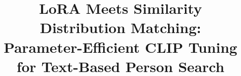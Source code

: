 \documentclass[conference,a4paper]{IEEEtran}
\begin{document}
\title{LoRA Meets Similarity Distribution Matching:\\
Parameter-Efficient CLIP Tuning for Text-Based Person Search}

\author{
}

\maketitle









\balance


\end{document}
